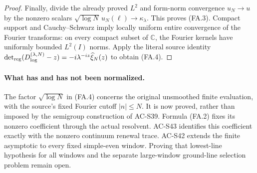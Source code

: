 \begin{proof}
Finally, divide the already proved \(L^2\) and form-norm
convergence \(u_N\to u\) by the nonzero scalars
\(\sqrt{\log N}\,u_N(\ell)\to\kappa_\lambda\).
This proves (FA.3).
Compact support and Cauchy--Schwarz imply locally uniform entire
convergence of the Fourier transforms: on every compact subset
of \(\mathbb C\), the Fourier kernels have uniformly bounded
\(L^2(I)\) norms.
Apply the literal source identity
\(\det_{\rm reg}(D^{(\lambda,N)}_{\log}-z)
 =-i\lambda^{-iz}\widehat\xi_N(z)\)
to obtain (FA.4).
\end{proof}

\paragraph{What has and has not been normalized.}
The factor \(\sqrt{\log N}\) in (FA.4) concerns the original
unsmoothed finite evaluation, with the source's fixed Fourier
cutoff \(|n|\leq N\).  It is now proved, rather than imposed by
the semigroup construction of AC-S39.  Formula (FA.2) fixes its
nonzero coefficient through the actual resolvent.
AC-S43 identifies this coefficient exactly with the nonzero continuum
renewal trace.  AC-S42 extends the finite asymptotic to every fixed
simple-even window.  Proving that
lowest-line hypothesis for all windows and the separate large-window
ground-line selection problem remain open.
